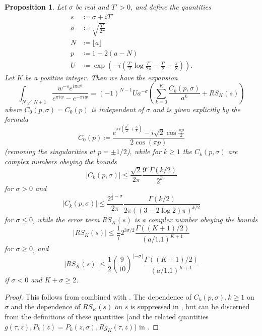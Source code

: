 \documentclass[a4paper,11pt,twoside]{amsart}
\newtheorem{proposition}[theorem]{Proposition}
\begin{document}
\begin{proposition}\label{arias-prop}  Let $\sigma$ be real and $T'>0$, and define the quantities
\begin{align}
s &\coloneqq \sigma + iT' \label{s-def}\\
a &\coloneqq \sqrt{\frac{T'}{2\pi}} \label{a-def}\\
N &\coloneqq \lfloor a \rfloor \label{N-def}\\
p &\coloneqq 1 - 2(a-N) \label{p-def}\\
U &\coloneqq \exp\left( -i\left(\frac{T'}{2} \log \frac{T'}{2\pi} - \frac{T'}{2} - \frac{\pi}{8}\right) \right)\label{U-def}.
\end{align}
Let $K$ be a positive integer.  Then we have the expansion
$$ \int_{N \swarrow N+1} \frac{w^{-s} e^{i\pi w^2}}{e^{\pi i w} - e^{-\pi i w}} = (-1)^{N-1} U a^{-\sigma} \left(\sum_{k=0}^K \frac{C_k(p,\sigma)}{a^k} + RS_K(s)\right) $$
where $C_0(p,\sigma) = C_0(p)$ is independent of $\sigma$ and is given explicitly by the formula
\begin{equation}\label{C0-def}
C_0(p) \coloneqq \frac{e^{\pi i (\frac{p^2}{2} +\frac{3}{8})} - i \sqrt{2} \cos \frac{\pi p}{2}}{2 \cos(\pi p)}
\end{equation}
(removing the singularities at $p = \pm 1/2$), while for $k \geq 1$ the $C_k(p,\sigma)$ are complex numbers obeying the bounds
\begin{equation}\label{ck-bound-1}
|C_k(p,\sigma)| \leq \frac{\sqrt{2}}{2\pi} \frac{9^\sigma \Gamma(k/2)}{2^k}
\end{equation}
for $\sigma>0$ and
\begin{equation}\label{ck-bound-2}
|C_k(p,\sigma)| \leq \frac{2^{\frac{1}{2}-\sigma}}{2\pi} \frac{\Gamma(k/2)}{2\pi ((3-2\log 2)\pi)^{k/2}}
\end{equation}
for $\sigma \leq 0$, while the error term $RS_K(s)$ is a complex number obeying the bounds
\begin{equation}\label{rsk-bound-1}
|RS_K(s)| \leq \frac{1}{7} 2^{3\sigma/2} \frac{\Gamma((K+1)/2)}{(a/1.1)^{K+1}}
\end{equation}
for $\sigma \geq 0$, and
\begin{equation}\label{rsk-bound-2}
|RS_K(s)| \leq \frac{1}{2} \left(\frac{9}{10}\right)^{\lceil -\sigma \rceil} \frac{\Gamma((K+1)/2)}{(a/1.1)^{K+1}}
\end{equation}
if $\sigma < 0$ and $K + \sigma \geq 2$.
\end{proposition}

\begin{proof} This follows from \cite[Theorems 3.1, 4.1, 4.2]{arias} combined with \cite[(3.2), (5.2)]{arias}.  The dependence of $C_k(p,\sigma), k \geq 1$ on $\sigma$ and the dependence of $RS_K(s)$ on $s$ is suppressed in \cite{arias}, but can be discerned from the definitions of these quantities (and the related quantities $g(\tau,z), P_k(z) = P_k(z,\sigma), Rg_K(\tau,z)$) in \cite[(3.9), (3.10), (3.7), (3.6)]{arias}.
\end{proof}
\end{document}
